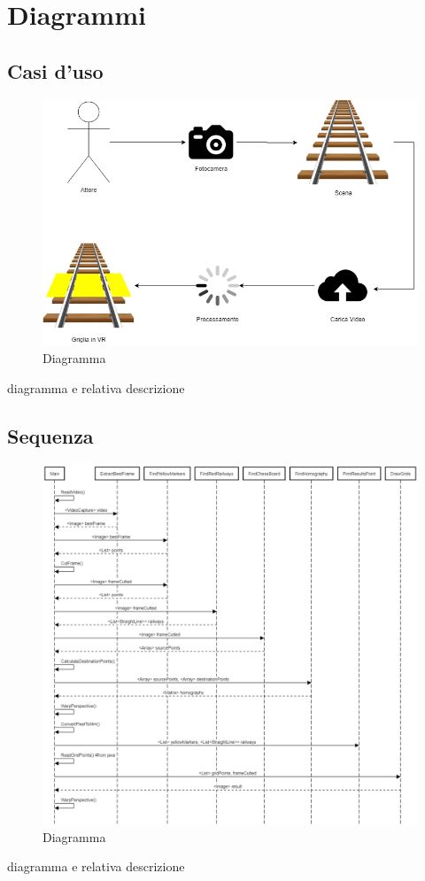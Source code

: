 \documentclass[twoside]{supsistudent}
\begin{document}
\chapter{Diagrammi}

\section{Casi d'uso}
\begin{figure}[H]
  \center
  \includegraphics[scale=0.50]{images/UseCase.png}
  \caption{Diagramma}
\end{figure}
diagramma e relativa descrizione
\section{Sequenza}
\begin{figure}[H]
  \center
  \includegraphics[scale=0.32]{images/Sequence.png}
  \caption{Diagramma}
\end{figure}
diagramma e relativa descrizione
\end{document}
